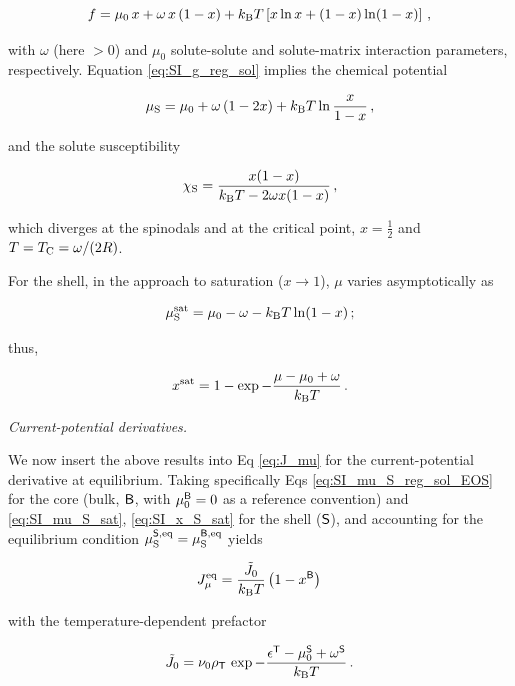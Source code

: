 \documentclass[english,aps,prb,showkeys,reprint]{revtex4-2}
\newcommand{\be}{\begin{equation}}
\newcommand{\ee}{\end{equation}}
\begin{document}
\be
\label{eq:SI_g_reg_sol}
f
=
\mu_0 \, x
+ \omega \, x \, (1-x)
+ k_{\rm B} T \left[ x \ln x + (1-x) \ln (1-x) \right]
 \,,
\ee

with $\omega$ (here $>0$) and $\mu_0$ solute-solute and solute-matrix interaction parameters, respectively. Equation \ref{eq:SI_g_reg_sol} implies the chemical potential

\begin{gather}
\label{eq:SI_mu_S_reg_sol_EOS}
\mu_{\rm S} = \mu_0 + \omega \, (1 - 2 x)
+ k_{\rm B} T \ln \frac x {1-x} \,,
\end{gather}

and the solute susceptibility

\be
\chi_{\rm S}
=
\frac{x (1-x)}{k_{\rm B} T -  2 \omega x (1-x)} \,,
\ee

which diverges at the spinodals and at the critical point, $x = \tfrac 1 2$ and $T = T_{\rm C} = \omega / (2R)$.

For the shell, in the approach to saturation ($x \rightarrow 1$), $\mu$ varies asymptotically as

\begin{gather}
\label{eq:SI_mu_S_sat}
\mu^{\rm sat}_{\rm S} =
\mu_0 - \omega
- k_{\rm B} T \ln (1-x) \,;
\end{gather}

thus,

\begin{gather}
\label{eq:SI_x_S_sat}
x^{\rm sat}
=
1 - \exp -\frac{\mu - \mu_0 + \omega}{k_{\rm B} T} \,.
\end{gather}

\textit{Current-potential derivatives.}

We now insert the above results into Eq \ref{eq:J_mu} for the current-potential derivative at equilibrium. Taking specifically Eqs \ref{eq:SI_mu_S_reg_sol_EOS} for the core (bulk, $\sf B$, with $\mu_0^{\sf B} = 0$ as a reference convention) and \ref{eq:SI_mu_S_sat}, \ref{eq:SI_x_S_sat} for the shell ($\sf S$), and accounting for the equilibrium condition $\mu^{\sf S, \rm eq}_{\rm S} = \mu^{\sf B, \rm eq}_{\rm S}$ yields

\be
\label{eq:SI_J_mu_toy}
J^{\rm eq}_{\mu}
=
\frac{\tilde J_0}{k_{\rm B} T}
\left( 1 - x^{\sf B} \right)\,
\ee

with the temperature-dependent prefactor

\be
\label{eq:SI_J_mu_toy_prefactor}
\tilde J_0
=
\nu_0 \rho_{\sf T} \,
  \exp - \frac{\epsilon^{\sf T} - \mu_0^{\sf S} + \omega^{\sf S}  }{k_{\rm B} T} \,.
\ee
\end{document}
